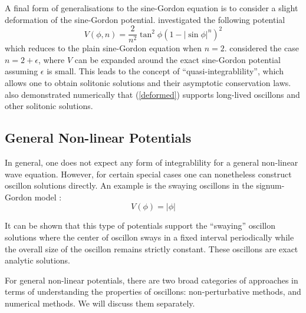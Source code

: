 \documentclass{report}
\begin{document}
A final form of generalisations to the sine-Gordon equation is to consider a slight deformation of the sine-Gordon potential. \cite{Ferreira2011} investigated the following potential
\begin{equation}\label{deformed}
  V(\phi, n) = \frac{2}{n^2} \tan^2 \phi \left( 1 - \left|\sin\phi\right|^n \right)^2
\end{equation}
which reduces to the plain sine-Gordon equation when $n=2$. \cite{Ferreira2011} considered the case $n=2+\epsilon$, where $V$ can be expanded around the exact sine-Gordon potential assuming $\epsilon$ is small. This leads to the concept of ``quasi-integrablility'', which allows one to obtain solitonic solutions and their asymptotic conservation laws. \cite{Ferreira2011} also demonstrated numerically that (\ref{deformed}) supports long-lived oscillons and other solitonic solutions.

\subsection{General Non-linear Potentials}
In general, one does not expect any form of integrablility for a general non-linear wave equation. However, for certain special cases one can nonetheless construct oscillon solutions directly. An example is the swaying oscillons in the signum-Gordon model \cite{Arodz:2011zm}:
\begin{equation}
  V(\phi)=\left|\phi\right|
\end{equation}

It can be shown \cite{Arodz:2011zm} that this type of potentials support the ``swaying'' oscillon solutions where the center of oscillon sways in a fixed interval periodically while the overall size of the oscillon remains strictly constant. These oscillons are exact analytic solutions.

\medbreak

For general non-linear potentials, there are two broad categories of approaches in terms of understanding the properties of oscillons: non-perturbative methods, and numerical methods. We will discuss them separately.
\end{document}

